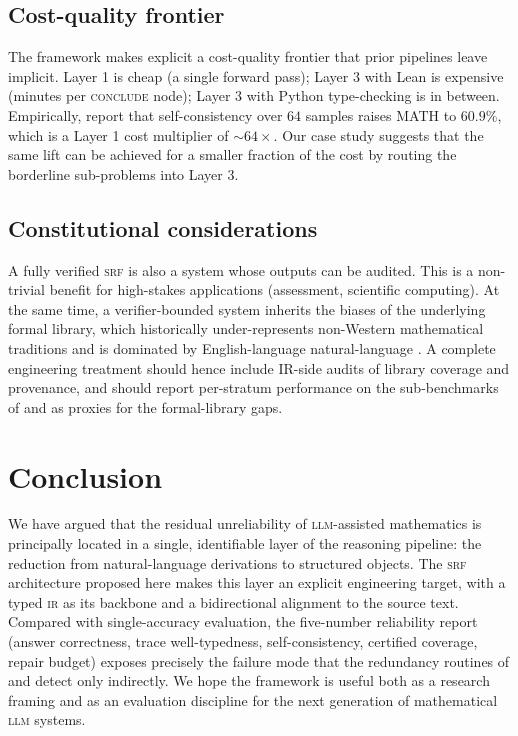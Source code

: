 \documentclass[11pt,a4paper]{article}
\newcommand{\LLM}{\textsc{llm}}
\newcommand{\IR}{\textsc{ir}}
\newcommand{\IRpipeline}{\textsc{srf}}
\begin{document}
\subsection{Cost-quality frontier}
The framework makes explicit a cost-quality frontier that prior
pipelines leave implicit.  Layer 1 is cheap (a single forward
pass); Layer 3 with Lean is expensive (minutes per \textsc{conclude}
node); Layer 3 with Python type-checking is in between.
Empirically, \citet{shao2024deepseekmath} report that
self-consistency over $64$ samples raises MATH to $60.9\%$, which is
a Layer 1 cost multiplier of $\sim 64\times$.  Our case study
suggests that the same lift can be achieved for a smaller fraction
of the cost by routing the borderline sub-problems into Layer 3.

\subsection{Constitutional considerations}
A fully verified \IRpipeline{} is also a system whose outputs can be
audited.  This is a non-trivial benefit for high-stakes applications
(assessment, scientific computing).  At the same time, a
verifier-bounded system inherits the biases of the underlying formal
library, which historically under-represents non-Western mathematical
traditions and is dominated by English-language natural-language
\citep[cf.][]{ji2023hallucination}.  A complete engineering treatment
should hence include IR-side audits of library coverage and
provenance, and should report per-stratum performance on the
sub-benchmarks of \citet{lu2024mathvista} and
\citet{tsoukalas2024putnambench} as proxies for the formal-library
gaps.

\section{Conclusion}
\label{sec:conclusion}

We have argued that the residual unreliability of \LLM{}-assisted
mathematics is principally located in a single, identifiable layer
of the reasoning pipeline: the reduction from natural-language
derivations to structured objects.  The \IRpipeline{} architecture
proposed here makes this layer an explicit engineering target, with
a typed \IR{} as its backbone and a bidirectional alignment to the
source text.  Compared with single-accuracy evaluation, the
five-number reliability report (answer correctness, trace
well-typedness, self-consistency, certified coverage, repair
budget) exposes precisely the failure mode that the redundancy
routines of \citet{lightman2023letsverify} and
\citet{shao2024deepseekmath} detect only indirectly.  We hope the
framework is useful both as a research framing and as an evaluation
discipline for the next generation of mathematical \LLM{}
systems.
\end{document}
